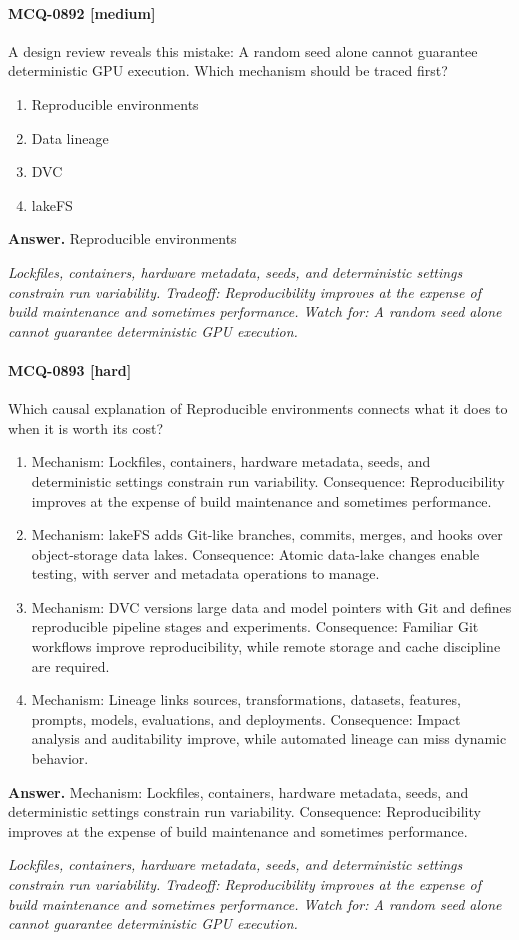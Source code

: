 \paragraph{MCQ-0892 [medium]} A design review reveals this mistake: A random seed alone cannot guarantee deterministic GPU execution. Which mechanism should be traced first?
\begin{enumerate}[label=\Alph*.]
\item Reproducible environments
\item Data lineage
\item DVC
\item lakeFS
\end{enumerate}
\noindent\textbf{Answer.} Reproducible environments
\par\textit{Lockfiles, containers, hardware metadata, seeds, and deterministic settings constrain run variability. Tradeoff: Reproducibility improves at the expense of build maintenance and sometimes performance. Watch for: A random seed alone cannot guarantee deterministic GPU execution.}
\paragraph{MCQ-0893 [hard]} Which causal explanation of Reproducible environments connects what it does to when it is worth its cost?
\begin{enumerate}[label=\Alph*.]
\item Mechanism: Lockfiles, containers, hardware metadata, seeds, and deterministic settings constrain run variability. Consequence: Reproducibility improves at the expense of build maintenance and sometimes performance.
\item Mechanism: lakeFS adds Git-like branches, commits, merges, and hooks over object-storage data lakes. Consequence: Atomic data-lake changes enable testing, with server and metadata operations to manage.
\item Mechanism: DVC versions large data and model pointers with Git and defines reproducible pipeline stages and experiments. Consequence: Familiar Git workflows improve reproducibility, while remote storage and cache discipline are required.
\item Mechanism: Lineage links sources, transformations, datasets, features, prompts, models, evaluations, and deployments. Consequence: Impact analysis and auditability improve, while automated lineage can miss dynamic behavior.
\end{enumerate}
\noindent\textbf{Answer.} Mechanism: Lockfiles, containers, hardware metadata, seeds, and deterministic settings constrain run variability. Consequence: Reproducibility improves at the expense of build maintenance and sometimes performance.
\par\textit{Lockfiles, containers, hardware metadata, seeds, and deterministic settings constrain run variability. Tradeoff: Reproducibility improves at the expense of build maintenance and sometimes performance. Watch for: A random seed alone cannot guarantee deterministic GPU execution.}
